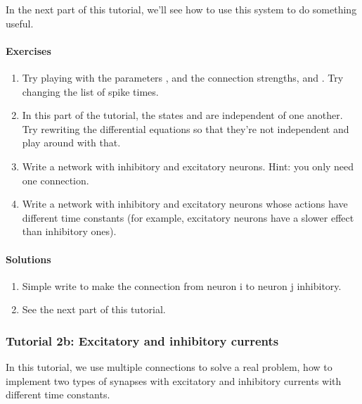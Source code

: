 \documentclass[letterpaper,10pt,english]{manual}
\begin{document}
In the next part of this tutorial, we'll see how to use this
system to do something useful.


\paragraph{Exercises}
\begin{enumerate}
\item {} 
Try playing with the parameters ,  and the connection
strengths,  and . Try changing the list of
spike times.

\item {} 
In this part of the tutorial, the states  and  are
independent of one another. Try rewriting the differential
equations so that they're not independent and play around
with that.

\item {} 
Write a network with inhibitory and excitatory neurons. Hint: you
only need one connection.

\item {} 
Write a network with inhibitory and excitatory neurons whose
actions have different time constants (for example, excitatory
neurons have a slower effect than inhibitory ones).

\end{enumerate}


\paragraph{Solutions}
\begin{enumerate}
\item {} 
Simple write  to make the connection from neuron
i to neuron j inhibitory.

\item {} 
See the next part of this tutorial.

\end{enumerate}

\resetcurrentobjects


\subsubsection{Tutorial 2b: Excitatory and inhibitory currents}

In this tutorial, we use multiple connections to solve a real problem, how
to implement two types of synapses with excitatory and inhibitory currents
with different time constants.
\end{document}
